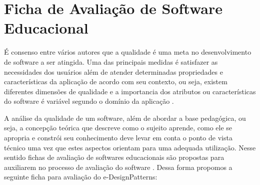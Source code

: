 \section{Ficha de Avaliação de Software Educacional}

É consenso entre vários autores que a qualidade é uma meta no desenvolvimento de software a ser atingida. Uma das principais medidas é satisfazer
 as necessidades dos usuários além de atender determinadas propriedades e características da aplicação de acordo com seu contexto, ou seja,
 existem diferentes dimensões de qualidade e a importancia dos atributos ou características do software é variável segundo o domínio da aplicação \cite{rocha2008avaliaccao}.
 
A análise da qualidade de um software, além de abordar a base pedagógica, ou seja, a concepção teórica que descreve como o sujeito aprende, como ele se apropria e constrói seu
conhecimento deve levar em conta o ponto de vista técnico uma vez que estes aspectos orientam para uma adequada utilização. Nesse sentido fichas de avaliação de softwares
educacionais são propostas para auxiliarem no processo de avaliação do software \cite{vieira1999avaliaccao}. Dessa forma propomos a seguinte ficha para avaliação do e-DesignPatterns:
